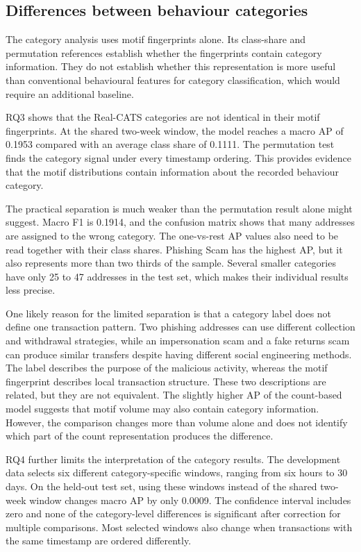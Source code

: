 \subsection{Differences between behaviour categories}

The category analysis uses motif fingerprints alone. Its class-share and
permutation references establish whether the fingerprints contain category
information. They do not establish whether this representation is more useful
than conventional behavioural features for category classification, which would
require an additional baseline.

RQ3 shows that the Real-CATS categories are not identical in their motif
fingerprints. At the shared two-week window, the model reaches a macro AP of
0.1953 compared with an average class share of 0.1111. The permutation test
finds the category signal under every timestamp ordering. This provides evidence
that the motif distributions contain information about the recorded behaviour
category.

The practical separation is much weaker than the permutation result alone might
suggest. Macro F1 is 0.1914, and the confusion matrix shows that many addresses
are assigned to the wrong category. The one-vs-rest AP values also need to be
read together with their class shares. Phishing Scam has the highest AP, but it
also represents more than two thirds of the sample. Several smaller categories
have only 25 to 47 addresses in the test set, which makes their individual
results less precise.

One likely reason for the limited separation is that a category label does not
define one transaction pattern. Two phishing addresses can use different
collection and withdrawal strategies, while an impersonation scam and a fake
returns scam can produce similar transfers despite having different social
engineering methods. The label describes the purpose of the malicious activity,
whereas the motif fingerprint describes local transaction structure. These two
descriptions are related, but they are not equivalent. The slightly higher AP of
the count-based model suggests that motif volume may also contain category
information. However, the comparison changes more than volume alone and does not
identify which part of the count representation produces the difference.

RQ4 further limits the interpretation of the category results. The development
data selects six different category-specific windows, ranging from six hours to
30 days. On the held-out test set, using these windows instead of the shared
two-week window changes macro AP by only 0.0009. The confidence interval includes
zero and none of the category-level differences is significant after correction
for multiple comparisons. Most selected windows also change when transactions
with the same timestamp are ordered differently.

